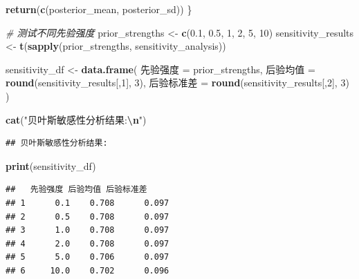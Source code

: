 \documentclass[
  twoside]{book}
\newenvironment{Shaded}{\begin{snugshade}}{\end{snugshade}}
\newcommand{\CommentTok}[1]{\textcolor[rgb]{0.56,0.35,0.01}{\textit{#1}}}
\newcommand{\DecValTok}[1]{\textcolor[rgb]{0.00,0.00,0.81}{#1}}
\newcommand{\FloatTok}[1]{\textcolor[rgb]{0.00,0.00,0.81}{#1}}
\newcommand{\FunctionTok}[1]{\textcolor[rgb]{0.13,0.29,0.53}{\textbf{#1}}}
\newcommand{\NormalTok}[1]{#1}
\newcommand{\OtherTok}[1]{\textcolor[rgb]{0.56,0.35,0.01}{#1}}
\newcommand{\SpecialCharTok}[1]{\textcolor[rgb]{0.81,0.36,0.00}{\textbf{#1}}}
\newcommand{\StringTok}[1]{\textcolor[rgb]{0.31,0.60,0.02}{#1}}
\begin{document}
\begin{Shaded}
\begin{Highlighting}[]
  \FunctionTok{return}\NormalTok{(}\FunctionTok{c}\NormalTok{(posterior\_mean, posterior\_sd))}
\NormalTok{\}}

\CommentTok{\# 测试不同先验强度}
\NormalTok{prior\_strengths }\OtherTok{\textless{}{-}} \FunctionTok{c}\NormalTok{(}\FloatTok{0.1}\NormalTok{, }\FloatTok{0.5}\NormalTok{, }\DecValTok{1}\NormalTok{, }\DecValTok{2}\NormalTok{, }\DecValTok{5}\NormalTok{, }\DecValTok{10}\NormalTok{)}
\NormalTok{sensitivity\_results }\OtherTok{\textless{}{-}} \FunctionTok{t}\NormalTok{(}\FunctionTok{sapply}\NormalTok{(prior\_strengths, sensitivity\_analysis))}

\NormalTok{sensitivity\_df }\OtherTok{\textless{}{-}} \FunctionTok{data.frame}\NormalTok{(}
\NormalTok{  先验强度 }\OtherTok{=}\NormalTok{ prior\_strengths,}
\NormalTok{  后验均值 }\OtherTok{=} \FunctionTok{round}\NormalTok{(sensitivity\_results[,}\DecValTok{1}\NormalTok{], }\DecValTok{3}\NormalTok{),}
\NormalTok{  后验标准差 }\OtherTok{=} \FunctionTok{round}\NormalTok{(sensitivity\_results[,}\DecValTok{2}\NormalTok{], }\DecValTok{3}\NormalTok{)}
\NormalTok{)}

\FunctionTok{cat}\NormalTok{(}\StringTok{"贝叶斯敏感性分析结果:}\SpecialCharTok{\textbackslash{}n}\StringTok{"}\NormalTok{)}
\end{Highlighting}
\end{Shaded}

\begin{verbatim}
## 贝叶斯敏感性分析结果:
\end{verbatim}

\begin{Shaded}
\begin{Highlighting}[]
\FunctionTok{print}\NormalTok{(sensitivity\_df)}
\end{Highlighting}
\end{Shaded}

\begin{verbatim}
##   先验强度 后验均值 后验标准差
## 1      0.1    0.708      0.097
## 2      0.5    0.708      0.097
## 3      1.0    0.708      0.097
## 4      2.0    0.708      0.097
## 5      5.0    0.706      0.097
## 6     10.0    0.702      0.096
\end{verbatim}
\end{document}
